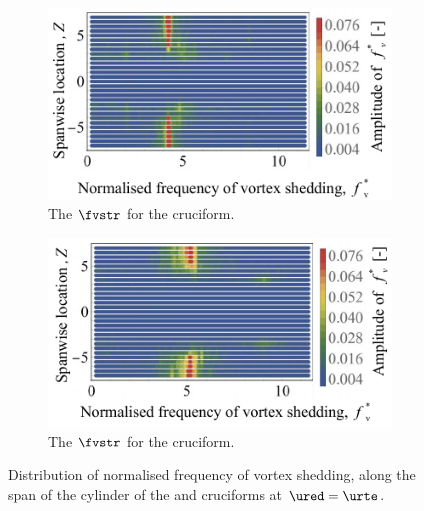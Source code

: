 \documentclass[a4paper,fleqn]{cas-sc}
\begin{document}
\begin{figure}
  \centering

  \begin{subfigure}[h]{0.46\textwidth}
    \includegraphics[width=\textwidth]{figs/probe675YU10}
    \caption{The $\fvstr$ for the \angfo{} cruciform.}
    \label{fig:probe675YU10}
  \end{subfigure}
  \hspace{6mm}
  \begin{subfigure}[h]{0.46\textwidth}
    \includegraphics[width=\textwidth]{figs/probe45YU10}
    \caption{The $\fvstr$ for the \angth{} cruciform.}
    \label{fig:probe45YU10}
  \end{subfigure}

  \caption{Distribution of normalised frequency of vortex shedding, along the span of the cylinder of the \angfo{} and \angth{} cruciforms at $\ured = \urte$.}
  \label{fig:probe67545YU10}
\end{figure}
\end{document}
